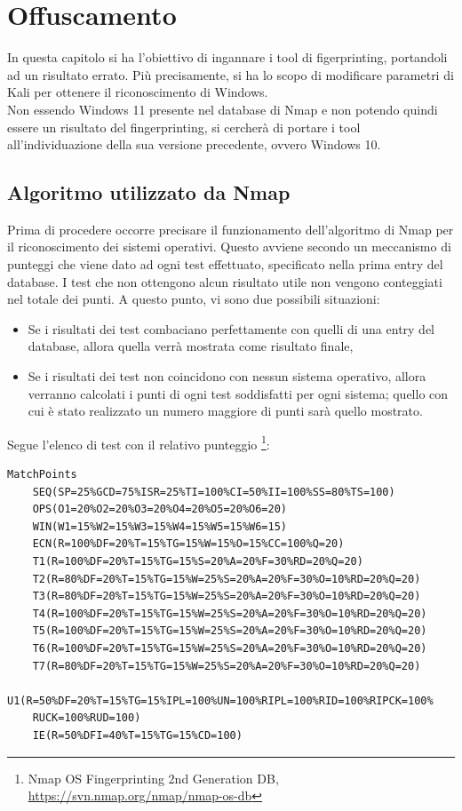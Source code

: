 \chapter{Offuscamento}

In questa capitolo si ha l'obiettivo di ingannare i tool di figerprinting, portandoli ad un risultato errato. Più precisamente, si ha lo scopo di modificare parametri di Kali per ottenere il riconoscimento di Windows.
\\
Non essendo Windows 11 presente nel database di Nmap e non potendo quindi essere un risultato del fingerprinting, si cercherà di portare i tool all'individuazione della sua versione precedente, ovvero Windows 10.

\section{Algoritmo utilizzato da Nmap} \label{algoritmi}
Prima di procedere occorre precisare il funzionamento dell'algoritmo di Nmap per il riconoscimento dei sistemi operativi. Questo avviene secondo un meccanismo di punteggi che viene dato ad ogni test effettuato, specificato nella prima entry del database. I test che non ottengono alcun risultato utile non vengono conteggiati nel totale dei punti.
A questo punto, vi sono due possibili situazioni:
\begin{itemize}
	\item Se i risultati dei test combaciano perfettamente con quelli di una entry del database, allora quella verrà mostrata come risultato finale,
	\item Se i risultati dei test non coincidono con nessun sistema operativo, allora verranno calcolati i punti di ogni test soddisfatti per ogni sistema; quello con cui è stato realizzato un numero maggiore di punti sarà quello mostrato.
\end{itemize}

Segue l'elenco di test con il relativo punteggio \footnote{Nmap OS Fingerprinting 2nd Generation DB, \url{https://svn.nmap.org/nmap/nmap-os-db}}:

\begin{lstlisting}[caption={Punteggi che Nmap attrribuisce ad ogni test}]
	MatchPoints
	SEQ(SP=25%GCD=75%ISR=25%TI=100%CI=50%II=100%SS=80%TS=100)
	OPS(O1=20%O2=20%O3=20%O4=20%O5=20%O6=20)
	WIN(W1=15%W2=15%W3=15%W4=15%W5=15%W6=15)
	ECN(R=100%DF=20%T=15%TG=15%W=15%O=15%CC=100%Q=20)
	T1(R=100%DF=20%T=15%TG=15%S=20%A=20%F=30%RD=20%Q=20)
	T2(R=80%DF=20%T=15%TG=15%W=25%S=20%A=20%F=30%O=10%RD=20%Q=20)
	T3(R=80%DF=20%T=15%TG=15%W=25%S=20%A=20%F=30%O=10%RD=20%Q=20)
	T4(R=100%DF=20%T=15%TG=15%W=25%S=20%A=20%F=30%O=10%RD=20%Q=20)
	T5(R=100%DF=20%T=15%TG=15%W=25%S=20%A=20%F=30%O=10%RD=20%Q=20)
	T6(R=100%DF=20%T=15%TG=15%W=25%S=20%A=20%F=30%O=10%RD=20%Q=20)
	T7(R=80%DF=20%T=15%TG=15%W=25%S=20%A=20%F=30%O=10%RD=20%Q=20)
	U1(R=50%DF=20%T=15%TG=15%IPL=100%UN=100%RIPL=100%RID=100%RIPCK=100%
	RUCK=100%RUD=100)
	IE(R=50%DFI=40%T=15%TG=15%CD=100)
\end{lstlisting}

